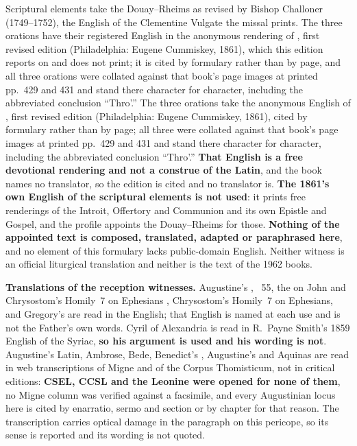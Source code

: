 Scriptural elements take the Douay--Rheims as revised by Bishop Challoner
(1749--1752), the English of the Clementine Vulgate the missal prints.%
\ifdefined\TriptychSynthesisEdition{} The three
orations have their registered English in the anonymous rendering of ,
first revised edition (Philadelphia: Eugene Cummiskey, 1861), which this edition
reports on and does not print; it is cited by formulary rather than by page, and
all three orations were collated against that book's page images at printed
pp.~429 and 431 and stand there character for character, including the
abbreviated conclusion ``Thro'.''%
\else{} The three
orations take the anonymous English of , first revised edition
(Philadelphia: Eugene Cummiskey, 1861), cited by formulary rather than by page;
all three were collated against that book's page images at printed pp.~429 and
431 and stand there character for character, including the abbreviated
conclusion ``Thro'.''%
\fi{} \textbf{That English is a free devotional rendering and not
a construe of the Latin}, and the book names no translator, so the edition is
cited and no translator is. \textbf{The 1861's own English of the scriptural
elements is not used}: it prints free renderings of the Introit, Offertory and
Communion and its own Epistle and Gospel, and the profile appoints the
Douay--Rheims for those. \textbf{Nothing of the appointed text is composed,
translated, adapted or paraphrased here}, and no element of this formulary lacks
public-domain English. Neither witness is an official liturgical translation and
neither is the text of the 1962 books.

\textbf{Translations of the reception witnesses.} Augustine's
, ~55, the  on John%
\ifdefined\TriptychSynthesisEdition{} and Chrysostom's Homily~7 on Ephesians%
\else, Chrysostom's Homily~7 on Ephesians, and Gregory's
%
\fi{} are read in the
 English; that English is named at
each use and is not the Father's own words. Cyril of Alexandria is read in
R.~Payne Smith's 1859 English of the Syriac, \textbf{so his argument is used and
his wording is not}. Augustine's Latin, Ambrose, Bede, Benedict's ,
Augustine's  and Aquinas are read in web
transcriptions of Migne and of the Corpus Thomisticum, not in critical editions:
\textbf{CSEL, CCSL and the Leonine were opened for none of them}, no Migne
column was verified against a facsimile, and every Augustinian locus here is
cited by enarratio, sermo and section or by chapter for that reason. The
 transcription carries optical damage in the
paragraph on this pericope, so its sense is reported and its wording is not
quoted.

